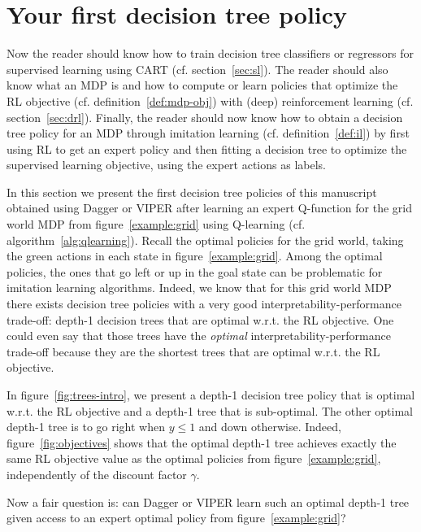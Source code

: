 \section{Your first decision tree policy}\label{sec:limits-il}
Now the reader should know how to train decision tree classifiers or regressors for supervised learning using CART (cf. section~\ref{sec:sl}).
The reader should also know what an MDP is and how to compute or learn policies that optimize the RL objective (cf. definition~\ref{def:mdp-obj}) with (deep) reinforcement learning (cf. section~\ref{sec:drl}).
Finally, the reader should now know how to obtain a decision tree policy for an MDP through imitation learning (cf. definition~\ref{def:il}) by first using RL to get an expert policy and then fitting a decision tree to optimize the supervised learning objective, using the expert actions as labels.

In this section we present the first decision tree policies of this manuscript obtained using Dagger or VIPER after learning an expert Q-function for the grid world MDP from figure~\ref{example:grid} using Q-learning (cf. algorithm~\ref{alg:qlearning}).
Recall the optimal policies for the grid world, taking the green actions in each state in figure~\ref{example:grid}. 
Among the optimal policies, the ones that go left or up in the goal state can be problematic for imitation learning algorithms.
Indeed, we know that for this grid world MDP there exists decision tree policies with a very good interpretability-performance trade-off: depth-1 decision trees that are optimal w.r.t. the RL objective.
One could even say that those trees have the \textit{optimal} interpretability-performance trade-off because they are the shortest trees that are optimal w.r.t. the RL objective.

In figure~\ref{fig:trees-intro}, we present a depth-1 decision tree policy that is optimal w.r.t. the RL objective and a depth-1 tree that is sub-optimal.
The other optimal depth-1 tree is to go right when $y\leq 1$ and down otherwise.
Indeed, figure~\ref{fig:objectives} shows that the optimal depth-1 tree achieves exactly the same RL objective value as the optimal policies from figure~\ref{example:grid}, independently of the discount factor $\gamma$.

Now a fair question is: can Dagger or VIPER learn such an optimal depth-1 tree given access to an expert optimal policy from figure~\ref{example:grid}?


